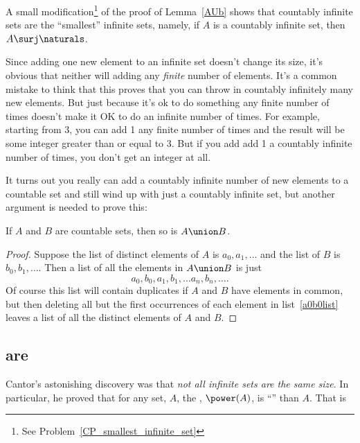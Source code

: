 A small modification\footnote{See Problem~\ref{CP_smallest_infinite_set}}
of the proof of Lemma~\ref{AUb} shows that countably infinite sets are
the ``smallest'' infinite sets, namely, if $A$ is a countably infinite
set, then $A \surj \naturals$.

Since adding one new element to an infinite set doesn't change its
size, it's obvious that neither will adding any \emph{finite} number
of elements.  It's a common mistake to think that this proves that you
can throw in countably infinitely many new elements.  But just because
it's ok to do something any finite number of times doesn't make it OK
to do an infinite number of times.  For example, starting from 3, you
can add 1 any finite number of times and the result will be some
integer greater than or equal to 3.  But if you add add 1 a countably
infinite number of times, you don't get an integer at all.

It turns out you really can add a countably infinite number of new
elements to a countable set and still wind up with just a countably
infinite set, but another argument is needed to prove this:

\begin{lemma}\label{countable-union}
If $A$ and $B$ are countable sets, then so is $A \union B$.
\end{lemma}

\begin{proof}
Suppose the list of distinct elements of $A$ is $a_0,a_1,\dots$ and the
list of $B$ is $b_0,b_1, \dots$.  Then a list of all the elements in $A
\union B$ is just
\begin{equation}\label{a0b0list}
a_0,b_0,a_1,b_1, \dots a_n,b_n, \dots.
\end{equation}
Of course this list will contain duplicates if $A$ and $B$ have elements
in common, but then deleting all but the first occurrences of each element in
list~\eqref{a0b0list} leaves a list of all the distinct elements of $A$
and $B$.
\end{proof}

\subsection{ are }

Cantor's astonishing discovery was that \emph{not all infinite sets
  are the same size}.  In particular, he proved that for any set, $A$,
the , $\power(A)$, is ``'' than
$A$.  That is

